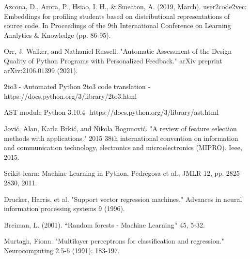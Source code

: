 \documentclass[a4paper, 14pt, oneside]{Thesis}
\begin{document}
\begin{spacing}{1.5}




\end{spacing}
\newpage
\appendix

% 
%
%
\begin{thebibliography}{99}
  
  
 Azcona, D., Arora, P., Hsiao, I. H., \& Smeaton, A. (2019, March). user2code2vec: Embeddings for profiling students based on distributional representations of source code. In Proceedings of the 9th International Conference on Learning Analytics \& Knowledge (pp. 86-95).


Orr, J. Walker, and Nathaniel Russell. "Automatic Assessment of the Design Quality of Python Programs with Personalized Feedback." arXiv preprint arXiv:2106.01399 (2021).

 2to3 - Automated Python 2to3 code translation -https://docs.python.org/3/library/2to3.html


 AST module Python 3.10.4- https://docs.python.org/3/library/ast.html


 Jović, Alan, Karla Brkić, and Nikola Bogunović. "A review of feature selection methods with applications." 2015 38th international convention on information and communication technology, electronics and microelectronics (MIPRO). Ieee, 2015.

 Scikit-learn: Machine Learning in Python, Pedregosa et al., JMLR 12, pp. 2825-2830, 2011.


 Drucker, Harris, et al. "Support vector regression machines." Advances in neural information processing systems 9 (1996).

 Breiman, L. (2001). “Random forests - Machine Learning” 45, 5-32.


 Murtagh, Fionn. "Multilayer perceptrons for classification and regression." Neurocomputing 2.5-6 (1991): 183-197.





\end{thebibliography}
\end{document}
